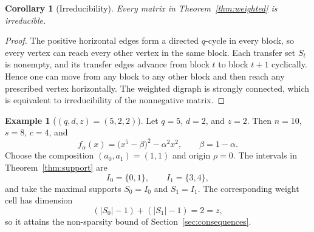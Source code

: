 \documentclass[11pt]{article}
\newtheorem{corollary}[theorem]{Corollary}
\theoremstyle{definition}
\newtheorem{example}[theorem]{Example}
\theoremstyle{remark}
\begin{document}
\begin{corollary}[Irreducibility]
\label{cor:irreducible}
Every matrix in Theorem~\ref{thm:weighted} is irreducible.
\end{corollary}

\begin{proof}
The positive horizontal edges form a directed $q$-cycle in every block, so every vertex can reach every other vertex in the same block. Each transfer set $S_t$ is nonempty, and its transfer edges advance from block $t$ to block $t+1$ cyclically. Hence one can move from any block to any other block and then reach any prescribed vertex horizontally. The weighted digraph is strongly connected, which is equivalent to irreducibility of the nonnegative matrix.
\end{proof}

\begin{example}[$(q,d,z)=(5,2,2)$]
\label{ex:522}
Let $q=5$, $d=2$, and $z=2$. Then $n=10$, $s=8$, $c=4$, and
\[
        f_\alpha(x)=\bigl(x^5-\beta\bigr)^2-\alpha^2x^2,
        \qquad \beta=1-\alpha.
\]
Choose the composition $(a_0,a_1)=(1,1)$ and origin $\rho=0$. The intervals in Theorem~\ref{thm:support} are
\[
        I_0=\{0,1\},
        \qquad
        I_1=\{3,4\},
\]
and take the maximal supports $S_0=I_0$ and $S_1=I_1$. The corresponding weight cell has dimension
\[
        (|S_0|-1)+(|S_1|-1)=2=z,
\]
so it attains the non-sparsity bound of Section~\ref{sec:consequences}.


\end{example}
\end{document}
